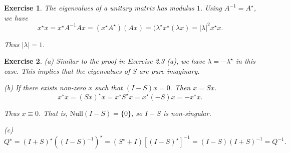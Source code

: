 \documentclass[paper=a4, fontsize=11pt]{scrartcl} %
\numberwithin{equation}{section} %
\numberwithin{figure}{section} %
\numberwithin{table}{section} %
\newtheorem{exercise}{Exercise}
\numberwithin{exercise}{section}
\begin{document}
\begin{exercise}
The eigenvalues of a unitary matrix has modulus $1$.
Using $A^{-1}=A^{\star}$, we have
 $$x^{\star}x=x^{\star} A^{-1} Ax=(x^{\star} A^{\star})( Ax)=(\lambda^{\star} x^{\star} (\lambda x)=|\lambda|^2  x^{\star} x.$$

 Thus $|\lambda|=1.$
\end{exercise}
\begin{exercise}
(a) Similar to  the proof in Exercise 2.3 (a), we have $\lambda=-\lambda^{\star}$ in this case. This implies that the eigenvalues of $S$ are pure imaginary. 

(b) If there exists non-zero $x$ such that  $(I-S)x=0.$ Then 
$x=Sx.$  
$$x^{\star} x=(Sx)^{\star} x=x^{\star} S^{\star} x=x^{\star} (-S)x=-x^{\star} x.$$

Thus $x\equiv 0$. That is, $\mathrm{Null}(I-S)=\{0\}$, so $I-S$ is non-singular.

(c) 
$$Q^{\star}=(I+S)^{\star}((I-S)^{-1})^{\star}=(S^\star+I)[(I-S)^{\star}]^{-1}=(I-S)(I+S)^{-1}=Q^{-1}.$$
\end{exercise}
\end{document}
